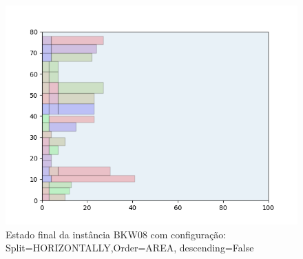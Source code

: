 \begin{figure}[H]
    \centering
    \caption[]{Estado final da instância BKW08 com configuração: Split=HORIZONTALLY,Order=AREA, descending=False}
    \label{fig:bkw08-horizontally-area-false}
    \includegraphics[scale=0.5]{output/figures/bkw/bkw08/horizontally/area/false/00}
\end{figure}